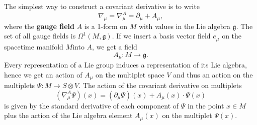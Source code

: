 \documentclass[11pt]{amsart}
\theoremstyle{definition}
\theoremstyle{remark}
\numberwithin{equation}{section}
\begin{document}
The simplest way to construct a covariant derivative is to write
\begin{equation*}
\nabla_\mu = \nabla_\mu^A= \partial_\mu+A_\mu,
\end{equation*}
where the {\bf gauge field} $A$ is a 1-form on $M$ with values in the Lie algebra $\mathfrak{g}$. The set of all gauge fields is $\Omega^1(M,\mathfrak{g})$. If we insert a basis vector field $e_\mu$ on the spacetime manifold $M$into $A$, we get a field
\begin{equation*}
A_\mu\colon M\longrightarrow\mathfrak{g}.
\end{equation*}
Every representation of a Lie group induces a representation of its Lie algebra, hence we get an action of $A_\mu$ on the multiplet space $V$ and thus an action on the multiplets $\Psi\colon M\rightarrow S\otimes V$. The action of the covariant derivative on multiplets
\begin{equation*}
(\nabla^A_\mu\Psi)(x)=(\partial_\mu\Psi)(x)+A_\mu(x)\cdot\Psi(x)
\end{equation*}
is given by the standard derivative of each component of $\Psi$ in the point $x\in M$ plus the action of the Lie algebra element $A_\mu(x)$ on the multiplet $\Psi(x)$.
\end{document}
